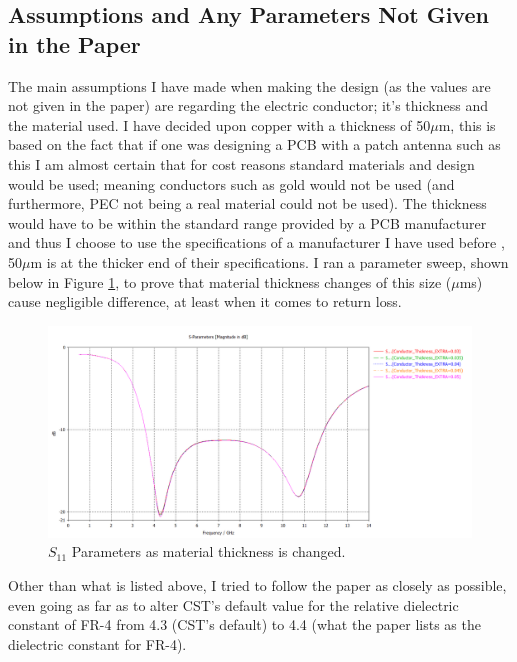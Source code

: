 \documentclass[colorlinks,11pt,a4paper,normalphoto,withhyper,ragged2e]{altareport}
\begin{document}
\subsection{Assumptions and Any Parameters Not Given in the Paper}
The main assumptions I have made when making the design (as the values are not given in the paper) are regarding the electric conductor; it's thickness and the material used. \linebreak 
I have decided upon copper with a thickness of 50{$\mu$}m, this is based on the fact that if one was designing a PCB with a patch antenna such as this I am almost certain that for cost reasons standard materials and design would be used; meaning conductors such as gold would not be used (and furthermore, PEC not being a real material could not be used). \linebreak
The thickness would have to be within the standard range provided by a PCB manufacturer and thus I choose to use the specifications of a manufacturer I have used before \cite{beta_layout}, 50{$\mu$}m is at the thicker end of their specifications. I ran a parameter sweep, shown below in Figure \ref{fig:param_sweep_thickness}, to prove that material thickness changes of this size ({$\mu$}ms) cause negligible difference, at least when it comes to return loss.\linebreak


\begin{figure}[ht]
	\centering
	\hspace{\fill}\includegraphics[width=14cm,valign=c]{Images/S1,1-conductor-thickness.png}\hspace{\fill}
	\caption{$S_{11}$ Parameters as material thickness is changed.}  %
	\label{fig:param_sweep_thickness}
\end{figure}

Other than what is listed above, I tried to follow the paper as closely as possible, even going as far as to alter CST's default value for the relative dielectric constant of FR-4 from 4.3 (CST's default) to 4.4 (what the paper lists as the dielectric constant for FR-4). \linebreak
\end{document}
